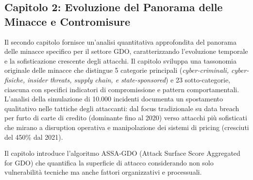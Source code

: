 \subsection{Capitolo 2: Evoluzione del Panorama delle Minacce e Contromisure}

Il secondo capitolo fornisce un'analisi quantitativa approfondita del panorama delle minacce specifico per il settore GDO, caratterizzando l'evoluzione temporale e la sofisticazione crescente degli attacchi. Il capitolo sviluppa una tassonomia originale delle minacce che distingue 5 categorie principali (\emph{cyber-criminali, cyber-fisiche, insider threats, supply chain, e state-sponsored}) e 23 sotto-categorie, ciascuna con specifici indicatori di compromissione e pattern comportamentali. L'analisi della simulazione di 10.000 incidenti documenta un spostamento qualitativo nelle tattiche degli attaccanti: dal focus tradizionale su data breach per furto di carte di credito (dominante fino al 2020) verso attacchi più sofisticati che mirano a disruption operativa e manipolazione dei sistemi di pricing (cresciuti del 450\% dal 2021).

Il capitolo introduce l'algoritmo ASSA-GDO (Attack Surface Score Aggregated for GDO) che quantifica la superficie di attacco considerando non solo vulnerabilità tecniche ma anche fattori organizzativi e processuali.


      
      


